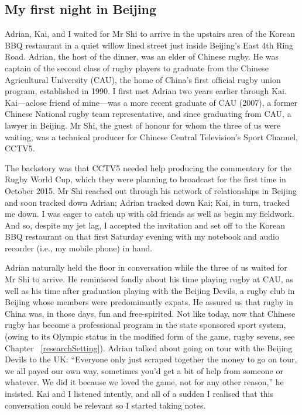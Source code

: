                                           \begin{CJK}{UTF8}{gbsn}

\section{My first night in Beijing \label{sect:adrian}}

Adrian, Kai, and I waited for Mr Shi to arrive in the upstairs area of the Korean BBQ restaurant in a quiet willow lined street just inside Beijing's East 4th Ring Road.  Adrian, the host of the dinner, was an elder of Chinese rugby.  He was captain of the second class of rugby players to graduate from the Chinese Agricultural University (CAU), the home of China's first official rugby union program, established in 1990.  I first met Adrian two years earlier through Kai. Kai---aclose friend of mine---was a more recent graduate of CAU (2007), a former Chinese National rugby team representative, and since graduating from CAU, a lawyer in Beijing.  Mr Shi, the guest of honour for whom the three of us were waiting, was a technical producer for Chinese Central Television's Sport Channel, CCTV5.

The backstory was that CCTV5 needed help producing the commentary for the Rugby World Cup, which they were planning to broadcast for the first time in October 2015.  Mr Shi reached out through his network of relationships in Beijing and soon tracked down Adrian; Adrian tracked down Kai; Kai, in turn, tracked me down.  I was eager to catch up with old friends as well as begin my fieldwork. And so, despite my jet lag, I accepted the invitation and set off to the Korean BBQ restaurant on that first Saturday evening with my notebook and audio recorder (i.e., my mobile phone) in hand.

Adrian naturally held the floor in conversation while the three of us waited for Mr Shi to arrive.  He reminisced fondly about his time playing rugby at CAU, as well as his time after graduation playing with the Beijing Devils, a rugby club in Beijing whose members were predominantly expats.  He assured us that rugby in China was, in those days, fun and free-spirited.  Not like today, now that Chinese rugby has become a professional program in the state sponsored sport system, (owing to its Olympic status in the modified form of the game, rugby sevens, see Chapter ~\ref{researchSetting}).  Adrian talked about going on tour with the Beijing Devils to the UK:  ``Everyone only just scraped together the money to go on tour, we all payed our own way, sometimes you'd get a bit of help from someone or whatever. We did it because we loved the game, not for any other reason,'' he insisted.  Kai and I listened intently, and all of a sudden I realised that this conversation could be relevant so I started taking notes.


\end{CJK}
